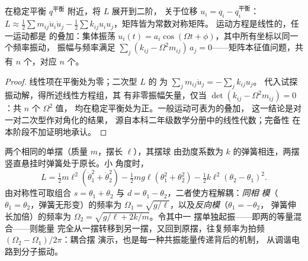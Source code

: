 \begin{proposition}[小振动与简正模]\label{prop:b3:lagrangian-mechanics:modes}
在稳定平衡 $q^{\text{平衡}}$ 附近，将 $L$ 展开到二阶，
关于位移 $u_i = q_i - q_i^{\text{平衡}}$：
$L \approx \tfrac12\sum m_{ij}\dot u_i\dot u_j -
\tfrac12\sum k_{ij}u_iu_j$，矩阵皆为常数对称矩阵。
运动方程是线性的，任一运动都是
\emph{}的叠加：集体振荡 $u_i(t) = a_i\cos(\Omega t
+ \phi)$，其中所有坐标以同一个频率振动，
振幅与频率满足 $\sum_j(k_{ij} -
\Omega^2m_{ij})\,a_j = 0$——矩阵本征值问题，共有 $n$
个，对应 $n$ 个。
\end{proposition}

\begin{proof}
线性项在平衡处为零；二次型 $L$ 的
为 $\sum_jm_{ij}\ddot u_j = -\sum_jk_{ij}u_j$。
代入试探振动解，得所述线性方程组，其
有非零振幅矢量，仅当 $\det(k_{ij} -
\Omega^2m_{ij}) = 0$：共 $n$ 个 $\Omega^2$ 值，
均在稳定平衡处为正。一般运动可表为的叠加，
这一结论是对一对二次型作对角化的结果，
源自本科二年级数学分册中的线性代数；完备性
在本阶段不加证明地承认。
\end{proof}

\begin{example}[由弹簧耦合的两个单摆]\label{ex:b3:lagrangian-mechanics:coupled}
两个相同的单摆（质量 $m$，摆长 $\ell$），其摆球
由劲度系数为 $k$ 的弹簧相连，两摆竖直悬挂时弹簧处于原长。小
角度时，
\[
L = \tfrac12 m\ell^2(\dot\theta_1^2 + \dot\theta_2^2)
 - \tfrac12 mg\ell(\theta_1^2 + \theta_2^2)
 - \tfrac12 k\ell^2(\theta_2 - \theta_1)^2 .
\]
由对称性可取组合 $s = \theta_1 + \theta_2$ 与 $d =
\theta_1 - \theta_2$，二者使方程解耦：\emph{同相
模}（$\theta_1 = \theta_2$，弹簧无形变）的频率为 $\Omega_1 =
\sqrt{g/\ell}$，以及\emph{反向模}（$\theta_1 = -\theta_2$，
弹簧伸长加倍）的频率为 $\Omega_2 = \sqrt{g/\ell + 2k/m}$。令其中一
摆单独起振——即两的等量混合——则能量
完全从一摆转移到另一摆，又回到原摆，往复频率为拍频
$(\Omega_2 - \Omega_1)/2\pi$：耦合摆
演示，也是每一种共振能量传递背后的机制，
从调谐电路到分子振动。
\end{example}


